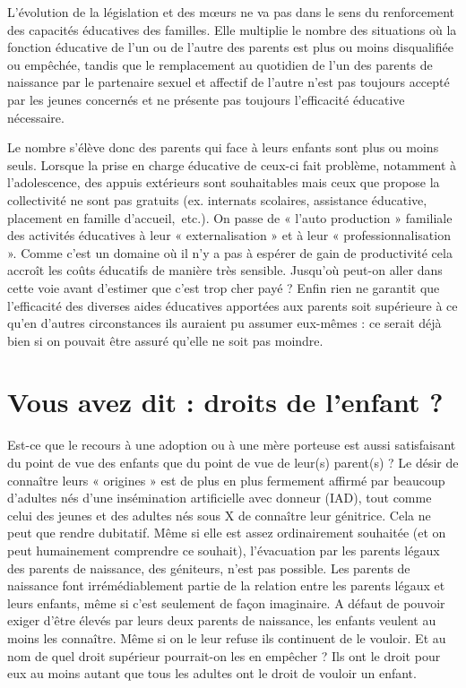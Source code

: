  L'évolution de la législation et des mœurs ne va pas dans le sens du renforcement des capacités éducatives des familles. Elle multiplie le nombre des situations où la fonction éducative de l'un ou de l'autre des parents est plus ou moins disqualifiée ou empêchée, tandis que le remplacement au quotidien de l'un des parents de naissance par le partenaire sexuel et affectif de l'autre n'est pas toujours accepté par les jeunes concernés et ne présente pas toujours l'efficacité éducative nécessaire. 

 Le nombre s'élève donc des parents qui face à leurs enfants sont plus ou moins seuls. Lorsque la prise en charge éducative de ceux-ci fait problème, notamment à l'adolescence, des appuis extérieurs sont souhaitables mais ceux que propose la collectivité ne sont pas gratuits (ex. internats scolaires, assistance éducative, placement en famille d'accueil,~etc.). On passe de « l'auto production » familiale des activités éducatives à leur « externalisation » et à leur « professionnalisation ». Comme c'est un domaine où il n'y a pas à espérer de gain de productivité cela accroît les coûts éducatifs de manière très sensible. Jusqu'où peut-on aller dans cette voie avant d'estimer que c'est trop cher payé ? Enfin rien ne garantit que l'efficacité des diverses aides éducatives apportées aux parents soit supérieure à ce qu'en d'autres circonstances ils auraient pu assumer eux-mêmes : ce serait déjà bien si on pouvait être assuré qu'elle ne soit pas moindre. 
 
 
 \section{Vous avez dit : droits de l'enfant ?}
 
 Est-ce que le recours à une adoption ou à une mère porteuse est aussi satisfaisant du point de vue des enfants que du point de vue de leur(s) parent(s) ? Le désir de connaître leurs « origines » est de plus en plus fermement affirmé par beaucoup d'adultes nés d'une insémination artificielle avec donneur (IAD), tout comme celui des jeunes et des adultes nés sous X de connaître leur génitrice. Cela ne peut que rendre dubitatif. Même si elle est assez ordinairement souhaitée (et on peut humainement comprendre ce souhait), l'évacuation par les parents légaux des parents de naissance, des géniteurs, n'est pas possible. Les parents de naissance font irrémédiablement partie de la relation entre les parents légaux et leurs enfants, même si c'est seulement de façon imaginaire. A défaut de pouvoir exiger d'être élevés par leurs deux parents de naissance, les enfants veulent au moins les connaître. Même si on le leur refuse ils continuent de le vouloir. Et au nom de quel droit supérieur pourrait-on les en empêcher ? Ils ont le droit pour eux au moins autant que tous les adultes ont le droit de vouloir un enfant. 
 

